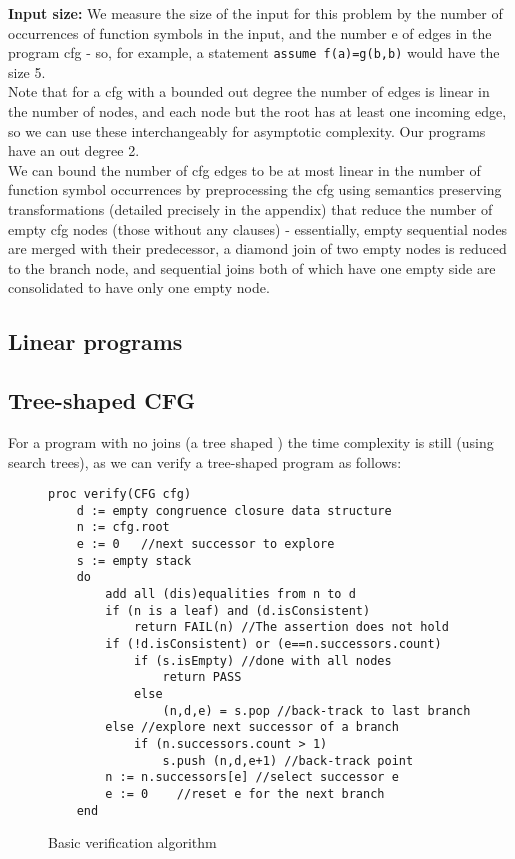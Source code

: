 \textbf{Input size:} We measure the size of the input for this problem by the number  of occurrences of function symbols in the input, and the number e of edges in the program cfg - so, for example, a statement \lstinline[mathescape]{assume f(a)=g(b,b)} would have the size 5. \\
Note that for a cfg with a bounded out degree the number of edges is linear in the number of nodes, and each node but the root has at least one incoming edge, so we can use these interchangeably for asymptotic complexity. Our programs have an out degree 2.\\
We can bound the number of cfg edges to be at most linear in the number of function symbol occurrences by preprocessing the 
cfg using semantics preserving transformations (detailed precisely in the appendix) that reduce the number of empty cfg nodes (those without any clauses) - essentially, 
empty sequential nodes are merged with their predecessor,
a diamond join of two empty nodes is reduced to the branch node, 
and sequential joins both of which have one empty side are consolidated to have only one empty node.

\subsection{Linear programs}

\subsection{Tree-shaped CFG}
For a program with no joins (a tree shaped \cfg) the time complexity is still  (using search trees), as we can verify a tree-shaped program as follows:
\begin{figure}[H]
\begin{lstlisting}
proc verify(CFG cfg)
	d := empty congruence closure data structure
	n := cfg.root
	e := 0   //next successor to explore
	s := empty stack
	do
		add all (dis)equalities from n to d
		if (n is a leaf) and (d.isConsistent)
			return FAIL(n) //The assertion does not hold
		if (!d.isConsistent) or (e==n.successors.count)
			if (s.isEmpty) //done with all nodes
				return PASS
			else
				(n,d,e) = s.pop //back-track to last branch
		else //explore next successor of a branch
			if (n.successors.count > 1)
				s.push (n,d,e+1) //back-track point
		n := n.successors[e] //select successor e
		e := 0    //reset e for the next branch
	end
\end{lstlisting}
\caption{Basic verification algorithm}
\label{basic_verification_algorithm}
\end{figure}

